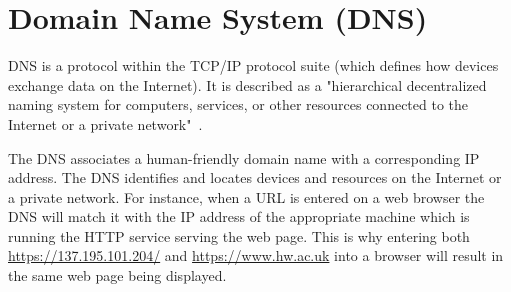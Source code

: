 \chapter{Domain Name System (DNS)}

DNS is a protocol within the TCP/IP protocol suite (which defines how
devices exchange data on the Internet). It is described as a "hierarchical
decentralized naming system for computers, services, or other resources
connected to the Internet or a private
network"~\cite{dnswiki}.

\vspace{0.5cm}

The DNS associates a human-friendly domain name with a corresponding IP
address. The DNS identifies and locates devices and resources on the Internet
or a private network. For instance, when a URL is entered on a web browser the
DNS will match it with the IP address of the appropriate machine which is
running the HTTP service serving the web page. This is why entering both
\url{https://137.195.101.204/} and \url{https://www.hw.ac.uk} into a browser
will result in the same web page being displayed.
